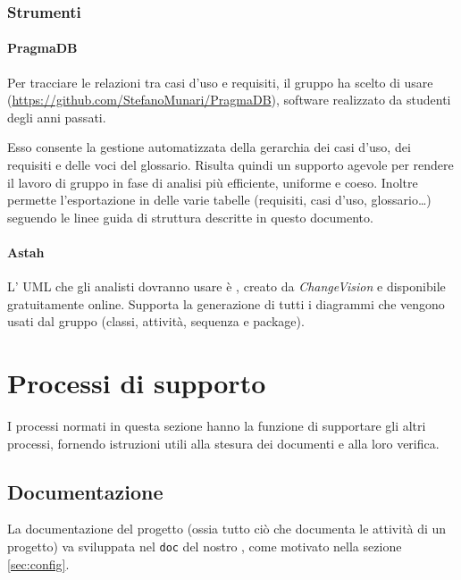 	\subsubsection{Strumenti}
		\paragraph{PragmaDB}
		Per tracciare le relazioni tra casi d'uso e requisiti, il gruppo ha scelto di usare  (\url{https://github.com/StefanoMunari/PragmaDB}), software realizzato da studenti degli anni passati.
		
		Esso consente la gestione automatizzata della gerarchia dei casi d'uso, dei requisiti e delle voci del glossario. Risulta quindi un supporto agevole per rendere il lavoro di gruppo in fase di analisi più efficiente, uniforme e coeso. Inoltre permette l'esportazione in  delle varie tabelle (requisiti, casi d'uso, glossario\dots) seguendo le linee guida di struttura descritte in questo documento.

		\paragraph{Astah}
		L' UML che gli analisti dovranno usare è , creato da \emph{ChangeVision} e disponibile gratuitamente online. Supporta la generazione di tutti i diagrammi che vengono usati dal gruppo (classi, attività, sequenza e package).





\section{Processi di supporto} \label{sec:supporto}
I processi normati in questa sezione hanno la funzione di supportare gli altri processi, fornendo istruzioni utili alla stesura dei documenti e alla loro verifica.

\subsection{Documentazione} \label{sec:doc}
La documentazione del progetto (ossia tutto ciò che documenta le attività di un progetto) va sviluppata nel  \texttt{doc} del nostro , come motivato nella sezione \ref{sec:config}.

